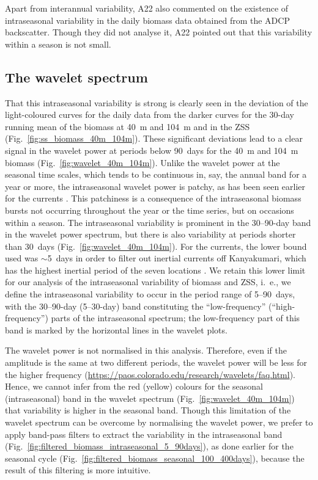 \documentclass[authoryear,review,11pt]{elsarticle}
\begin{document}
Apart from interannual variability, A22 also commented on the existence of intraseasonal variability in the daily biomass data obtained from the ADCP backscatter. Though they did not analyse it, A22 pointed out that this variability within a season is not small.

\subsection{The wavelet spectrum}
\label{sec:intraseasonal.wavelet}

That this intraseasonal variability is strong is clearly seen in the deviation of the light-coloured curves for the daily data from the darker curves for the 30-day running mean of the biomass at 40~m and 104~m and in the ZSS (Fig.~\ref{fig:ss_biomass_40m_104m}).  These significant deviations lead to a clear signal in the wavelet power at periods below 90~days for the 40~m and 104~m biomass (Fig.~\ref{fig:wavelet_40m_104m}).  Unlike the wavelet power at the seasonal time scales, which tends to be continuous in, say, the annual band for a year or more, the intraseasonal wavelet power is patchy, as has been seen earlier for the currents \citep{amol2014observed, mukherjee2014observed, chaudhuri2020observed, mukhopadhyay2020observed}. This patchiness is a consequence of the intraseasonal biomass bursts not occurring throughout the year or the time series, but on occasions within a season.  The intraseasonal variability is prominent in the 30--90-day band in the wavelet power spectrum, but there is also variability at periods shorter than 30~days (Fig.~\ref{fig:wavelet_40m_104m}). For the currents, the lower bound used was $\sim$5~days in order to filter out inertial currents off Kanyakumari, which has the highest inertial period of the seven locations \citep{amol2014observed, chaudhuri2020observed}.  We retain this lower limit for our analysis of the intraseasonal variability of biomass and ZSS, i.~e., we define the intraseasonal variability to occur in the period range of 5--90~days, with the 30--90-day (5--30-day) band constituting the ``low-frequency'' (``high-frequency'') parts of the intraseasonal spectrum; the low-frequency part of this band is marked by the horizontal lines in the wavelet plots.

The wavelet power is not normalised in this analysis.  Therefore, even if the amplitude is the same at two different periods, the wavelet power will be less for the higher frequency (\url{https://paos.colorado.edu/research/wavelets/faq.html}). Hence, we cannot infer from the red (yellow) colours for the seasonal (intraseasonal) band in the wavelet spectrum (Fig.~\ref{fig:wavelet_40m_104m}) that variability is higher in the seasonal band. Though this limitation of the wavelet spectrum can be overcome by normalising the wavelet power, we prefer to apply band-pass filters to extract the variability in the intraseasonal band (Fig.~\ref{fig:filtered_biomass_intraseasonal_5_90days}), as done earlier for the seasonal cycle (Fig.~\ref{fig:filtered_biomass_seasonal_100_400days}), because the result of this filtering is more intuitive. 
\end{document}
